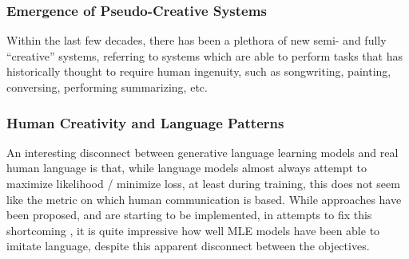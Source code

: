 \subsubsection{Emergence of Pseudo-Creative Systems}
\label{sec:pseudo-creative-system}

Within the last few decades, there has been a plethora of new semi- and fully “creative” systems, referring to systems which are able to perform tasks that has historically thought to require human ingenuity, such as songwriting, painting, conversing, performing summarizing, etc.


\subsubsection{Human Creativity and Language Patterns}
\label{sec:creativity+language-patterns}

An interesting disconnect between generative language learning models and real human language is that, while language models almost always attempt to maximize likelihood / minimize loss, at least during training, this does not seem like the metric on which human communication is based. While approaches have been proposed, and are starting to be implemented, in attempts to fix this shortcoming \cite{Welleck2019Unlikelyhood} \cite{HoltzmanAri2019TCCo}, it is quite impressive how well MLE models have been able to imitate language, despite this apparent disconnect between the objectives.

